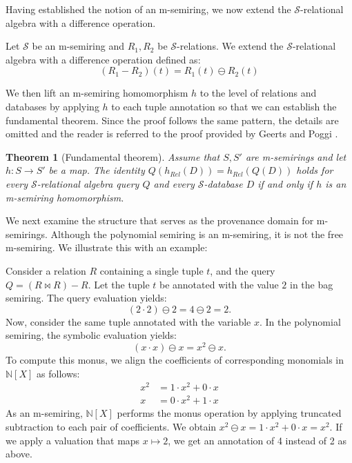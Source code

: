 \documentclass[oneside, 11pt]{amsbook}
\theoremstyle{plain}
\newtheorem{thm}{Theorem}[section]
\theoremstyle{definition}
\theoremstyle{remark}
\begin{document}
Having established the notion of an m-semiring, we now extend the $\mathcal{S}$-relational algebra with a difference operation.

\begin{defn}[Difference]
    Let $\mathcal{S}$ be an m-semiring and $R_1,R_2$ be $\mathcal{S}$-relations. We extend the $\mathcal{S}$-relational algebra with a difference operation defined as:
    \[
        (R_1 - R_2) (t) = R_1(t) \ominus R_2(t)
    \]
\end{defn}

We then lift an m-semiring homomorphism $h$ to the level of relations and databases by applying $h$ to each tuple annotation so that we can establish the fundamental theorem. Since the proof follows the same pattern, the details are omitted and the reader is referred to the proof provided by Geerts and Poggi \cite{Geerts2010}.

\begin{thm}[Fundamental theorem]
    Assume that $S, S'$ are m-semirings and let $h: S \to S'$ be a map. The identity $Q(h_{Rel}(D)) = h_{Rel}(Q(D))$ holds for every $\mathcal{S}$-relational algebra query $Q$ and every $\mathcal{S}$-database $D$ if and only if $h$ is an m-semiring homomorphism.
\end{thm}

We next examine the structure that serves as the provenance domain for m-semirings. Although the polynomial semiring is an m-semiring, it is not the free m-semiring. We illustrate this with an example:

\begin{exmpl}
    Consider a relation $R$ containing a single tuple $t$, and the query $Q = (R \bowtie R) - R$.  Let the tuple $t$ be annotated with the value $2$ in the bag semiring. The query evaluation yields:
    \[
        (2 \cdot 2) \ominus 2 = 4 \ominus 2 = 2.
    \]
    Now, consider the same tuple annotated with the variable $x$. In the polynomial semiring, the symbolic evaluation yields:
    \[
        (x \cdot x) \ominus x = x^2 \ominus x.
    \]
    To compute this monus, we align the coefficients of corresponding monomials in $\mathbb{N}[X]$ as follows:
    \[
        \begin{aligned}
            x^2 & = 1 \cdot x^2 + 0 \cdot x \\
            x   & = 0 \cdot x^2 + 1 \cdot x
        \end{aligned}
    \]
    As an m-semiring, $\mathbb{N}[X]$ performs the monus operation by applying truncated subtraction to each pair of coefficients. We obtain $x^2 \ominus x = 1 \cdot x^2 + 0 \cdot x = x^2$. If we apply a valuation that maps $x \mapsto 2$, we get an annotation of 4 instead of 2 as above.
\end{exmpl}
\end{document}
